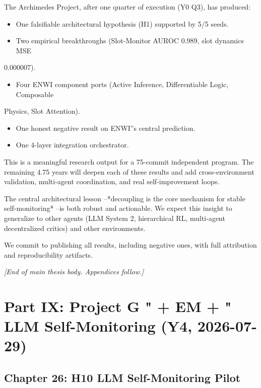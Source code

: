 \documentclass[11pt]{article}
\begin{document}
The Archimedes Project, after one quarter of execution (Y0 Q3), has produced:

\begin{itemize}
  \item One falsifiable architectural hypothesis (H1) supported by 5/5 seeds.
  \item Two empirical breakthroughs (Slot-Monitor AUROC 0.989, slot dynamics MSE
\end{itemize}

  0.000007).
\begin{itemize}
  \item Four ENWI component ports (Active Inference, Differentiable Logic, Composable
\end{itemize}

  Physics, Slot Attention).
\begin{itemize}
  \item One honest negative result on ENWI''s central prediction.
  \item One 4-layer integration orchestrator.
\end{itemize}


This is a meaningful research output for a 75-commit independent program. The
remaining 4.75 years will deepen each of these results and add cross-environment
validation, multi-agent coordination, and real self-improvement loops.

The central architectural lesson --*decoupling is the core mechanism for stable
self-monitoring* --is both robust and actionable. We expect this insight to
generalize to other agents (LLM System 2, hierarchical RL, multi-agent
decentralized critics) and other environments.

We commit to publishing all results, including negative ones, with full
attribution and reproducibility artifacts.

\hrulefill

\textit{[End of main thesis body. Appendices follow.]}



\hrulefill

\section{Part IX: Project G " + EM + " LLM Self-Monitoring (Y4, 2026-07-29)}

\subsection{Chapter 26: H10 LLM Self-Monitoring Pilot}
\end{document}
